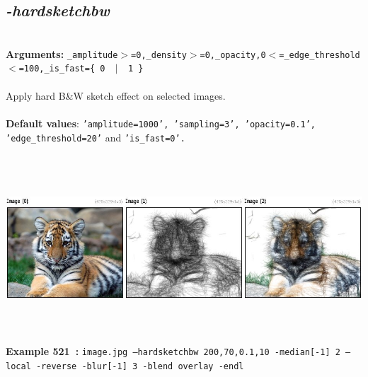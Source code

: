 \documentclass[a4paper,11pt,twoside]{book}
\begin{document}
\subsection{\emph{-hardsketchbw} }\vspace*{-0.5em}
~\\\textbf{Arguments: } 
{\small \texttt{\_amplitude$>$=0,\_density$>$=0,\_opacity,0$<$=\_edge\_threshold$<$=100,\_is\_fast=\{ 0 ~$|$~ 1 \}}}\\~\\
Apply hard B\&W sketch effect on selected images.
~\\~\\\textbf{Default values}: {\small \texttt{'amplitude=1000', 'sampling=3', 'opacity=0.1', 'edge\_threshold=20'} and \texttt{'is\_fast=0'.}}
\begin{center}\includegraphics[keepaspectratio=true,height=7cm,width=\textwidth]{img/gmic_def521.jpg}\\
{\footnotesize \textbf{Example 521~:} \texttt{image.jpg --hardsketchbw 200,70,0.1,10 -median[-1] 2 --local -reverse -blur[-1] 3 -blend overlay -endl}}
\end{center}
\end{document}
